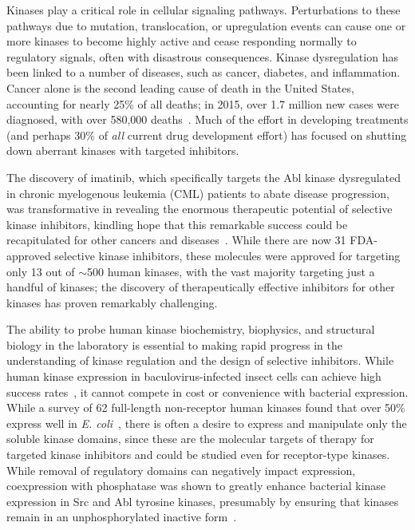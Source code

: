 \documentclass[aps,pre,twocolumn,nofootinbib,superscriptaddress,linenumbers]{revtex4-1}
\begin{document}
Kinases play a critical role in cellular signaling pathways.  
Perturbations to these pathways due to mutation, translocation, or upregulation events can cause one or more kinases to become highly active and cease responding normally to regulatory signals, often with disastrous consequences.
Kinase dysregulation has been linked to a number of diseases, such as cancer, diabetes, and inflammation.
Cancer alone is the second leading cause of death in the United States, accounting for nearly 25\% of all deaths; in 2015, over 1.7 million new cases were diagnosed, with over 580,000 deaths~\cite{acs-cancer-facts-2015}.
Much of the effort in developing treatments (and perhaps 30\% of \emph{all} current drug development effort) has focused on shutting down aberrant kinases with targeted inhibitors.

The discovery of imatinib, which specifically targets the Abl kinase dysregulated in chronic myelogenous leukemia (CML) patients to abate disease progression, was transformative in revealing the enormous therapeutic potential of selective kinase inhibitors, kindling hope that this remarkable success could be recapitulated for other cancers and diseases~\cite{stegmeier:clpt:2010:imatinib-lessons}.
While there are now 31 FDA-approved selective kinase inhibitors, these molecules were approved for targeting only 13 out of $\sim$500 human kinases, with the vast majority targeting just a handful of kinases; the discovery of therapeutically effective inhibitors for other kinases has proven remarkably challenging.

The ability to probe human kinase biochemistry, biophysics, and structural biology in the laboratory is essential to making rapid progress in the understanding of kinase regulation and the design of selective inhibitors.
While human kinase expression in baculovirus-infected insect cells can achieve high success rates~\cite{vertex:2004:kinase-expression,wang:protein-express-pur:2008:high-yield-kinase-insect-cells}, it cannot compete in cost or convenience with bacterial expression.
While a survey of 62 full-length non-receptor human kinases found that over 50\% express well in \emph{E. coli}~\cite{vertex:2004:kinase-expression}, there is often a desire to express and manipulate only the soluble kinase domains, since these are the molecular targets of therapy for targeted kinase inhibitors and could be studied even for receptor-type kinases.
While removal of regulatory domains can negatively impact expression, coexpression with phosphatase was shown to greatly enhance bacterial kinase expression in Src and Abl tyrosine kinases, presumably by ensuring that kinases remain in an unphosphorylated inactive form~\cite{seeliger:2005:protein-sci:kinase-expression}.
\end{document}

